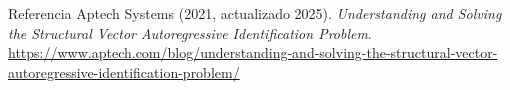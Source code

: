 \documentclass[11pt]{beamer}
\begin{document}
\begin{frame}{Referencia}
Aptech Systems (2021, actualizado 2025). \emph{Understanding and Solving the Structural Vector Autoregressive Identification Problem}. \\
\url{https://www.aptech.com/blog/understanding-and-solving-the-structural-vector-autoregressive-identification-problem/}
\end{frame}
\end{document}
